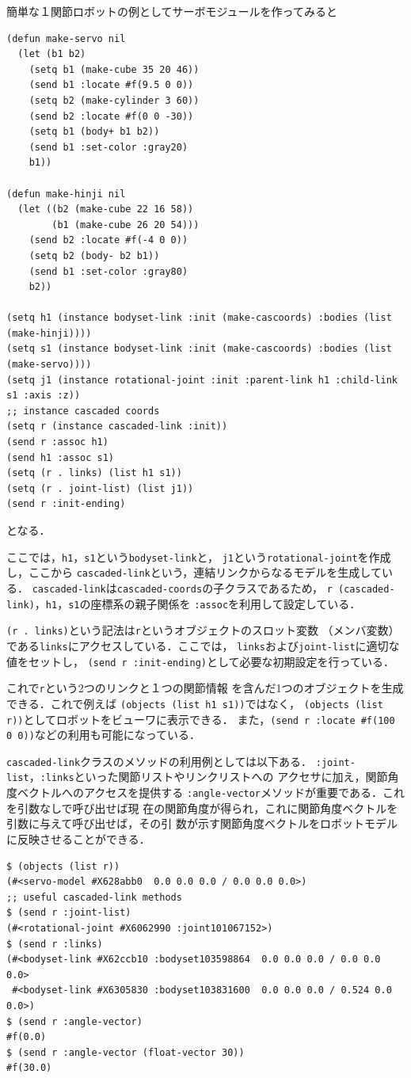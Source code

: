 簡単な１関節ロボットの例としてサーボモジュールを作ってみると
{\baselineskip=10pt
\begin{verbatim}
(defun make-servo nil
  (let (b1 b2)
    (setq b1 (make-cube 35 20 46))
    (send b1 :locate #f(9.5 0 0))
    (setq b2 (make-cylinder 3 60))
    (send b2 :locate #f(0 0 -30))
    (setq b1 (body+ b1 b2))
    (send b1 :set-color :gray20)
    b1))

(defun make-hinji nil
  (let ((b2 (make-cube 22 16 58))
        (b1 (make-cube 26 20 54)))
    (send b2 :locate #f(-4 0 0))
    (setq b2 (body- b2 b1))
    (send b1 :set-color :gray80)
    b2))

(setq h1 (instance bodyset-link :init (make-cascoords) :bodies (list (make-hinji))))
(setq s1 (instance bodyset-link :init (make-cascoords) :bodies (list (make-servo))))
(setq j1 (instance rotational-joint :init :parent-link h1 :child-link s1 :axis :z))
;; instance cascaded coords
(setq r (instance cascaded-link :init))
(send r :assoc h1)
(send h1 :assoc s1)
(setq (r . links) (list h1 s1))
(setq (r . joint-list) (list j1))
(send r :init-ending)
\end{verbatim}
}

となる．

ここでは，\verb|h1|，\verb|s1|という\verb|bodyset-link|と，
\verb|j1|という\verb|rotational-joint|を作成し，ここから
\verb|cascaded-link|という，連結リンクからなるモデルを生成している．
\verb|cascaded-link|は\verb|cascaded-coords|の子クラスであるため，
\verb|r (cascaded-link)|，\verb|h1|，\verb|s1|の座標系の親子関係を
\verb|:assoc|を利用して設定している．

\verb|(r . links)|という記法は\verb|r|というオブジェクトのスロット変数
     （メンバ変数）である\verb|links|にアクセスしている．ここでは，
\verb|links|および\verb|joint-list|に適切な値をセットし，
\verb|(send r :init-ending)|として必要な初期設定を行っている．

これで\verb|r|という2つのリンクと１つの関節情報
を含んだ1つのオブジェクトを生成できる．これで例えば
\verb|(objects (list h1 s1))|ではなく，
\verb|(objects (list r))|としてロボットをビューワに表示できる．
また，\verb|(send r :locate #f(100 0 0))|などの利用も可能になっている．

\verb|cascaded-link|クラスのメソッドの利用例としては以下ある．
\verb|:joint-list|，\verb|:links|といった関節リストやリンクリストへの
アクセサに加え，関節角度ベクトルへのアクセスを提供する
\verb|:angle-vector|メソッドが重要である．これを引数なしで呼び出せば現
在の関節角度が得られ，これに関節角度ベクトルを引数に与えて呼び出せば，その引
数が示す関節角度ベクトルをロボットモデルに反映させることができる．
{\baselineskip=10pt
\begin{verbatim}
$ (objects (list r))
(#<servo-model #X628abb0  0.0 0.0 0.0 / 0.0 0.0 0.0>)
;; useful cascaded-link methods
$ (send r :joint-list)
(#<rotational-joint #X6062990 :joint101067152>)
$ (send r :links)
(#<bodyset-link #X62ccb10 :bodyset103598864  0.0 0.0 0.0 / 0.0 0.0 0.0>
 #<bodyset-link #X6305830 :bodyset103831600  0.0 0.0 0.0 / 0.524 0.0 0.0>)
$ (send r :angle-vector)
#f(0.0)
$ (send r :angle-vector (float-vector 30))
#f(30.0)
\end{verbatim}
}

